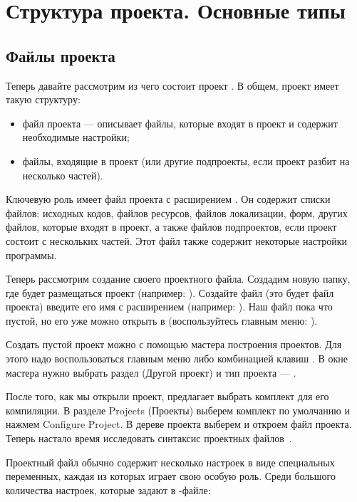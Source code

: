 \chapter[Структура проекта. Основные типы]{\bfseries Структура проекта. Основные типы}
\section[Файлы проекта]{Файлы проекта}
Теперь давайте рассмотрим из чего состоит проект . В общем, проект 
имеет такую структуру:

\begin{itemize}
\item {}файл проекта --- описывает файлы,
которые входят в проект и содержит необходимые настройки;
\item файлы, входящие в проект (или другие подпроекты, если проект разбит на несколько частей).
\end{itemize}
Ключевую роль имеет файл проекта с расширением .
Он содержит списки файлов: исходных кодов, файлов ресурсов, файлов локализации, форм, других файлов,
которые входят в проект, а также файлов подпроектов, если
проект состоит с нескольких частей. Этот файл также содержит некоторые настройки программы.

Теперь рассмотрим создание своего проектного файла. Создадим новую папку, 
где будет размещаться проект (например: ). Создайте файл (это будет файл 
проекта) введите его имя с расширением  (например:
). Наш файл пока что пустой, но его уже можно открыть в  
(воспользуйтесь главным меню: ). 

Создать пустой проект можно с
помощью  мастера построения проектов. Для этого надо воспользоваться главным меню 
 либо комбинацией клавиш . В 
окне мастера нужно выбрать раздел  (Другой проект) и тип 
проекта --- .

После того, как мы открыли проект,  предлагает выбрать комплект
для его компиляции. В разделе Projects (Проекты) выберем
комплект по умолчанию и нажмем Configure
Project. В дереве проекта выберем  и откроем файл проекта. Теперь настало время
исследовать синтаксис проектных файлов~.

Проектный файл обычно содержит несколько настроек в виде специальных переменных, каждая из которых играет
свою особую роль. Среди большого количества настроек, которые задают в -файле:

